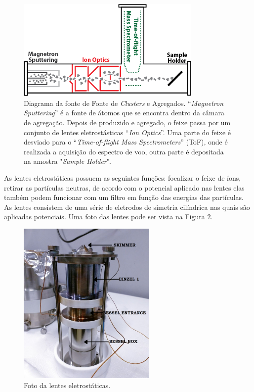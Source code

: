 \begin{figure}
  \centering
  \includegraphics[width=0.8\textwidth]{images/foca/esquematico_foca}
  \caption{ Diagrama da fonte de Fonte de \textit{Clusters} e Agregados. ``\textit{Magnetron Sputtering}'' é a fonte de átomos que se encontra dentro da câmara de agregação. Depois de produzido e agregado, o feixe passa por um conjunto de lentes eletrostásticas  ``\textit{Ion Optics}''. Uma parte do feixe é desviado para o ``\textit{Time-of-flight Mass Spectrometers}'' (ToF), onde é realizada a aquisição do espectro de voo, outra parte é depositada na amostra "\textit{Sample Holder}"\cite{livro_vitor}.  }
  \label{fig:esquema_foca}
\end{figure}

As lentes eletrostáticas possuem as seguintes funções: focalizar o feixe de íons, retirar as partículas neutras, de acordo com o potencial aplicado nas lentes elas também podem funcionar com um filtro em função das energias das partículas. As lentes consistem de uma série de eletrodos de simetria cilíndrica nas quais são aplicadas potenciais. Uma foto das lentes pode ser vista na Figura \ref{fig:foto_lentes}.

\begin{figure}
  \centering
  \includegraphics[width=0.6\textwidth]{images/foca/lentes}
  \caption{ Foto da lentes eletrostáticas.  }
  \label{fig:foto_lentes}
\end{figure}



